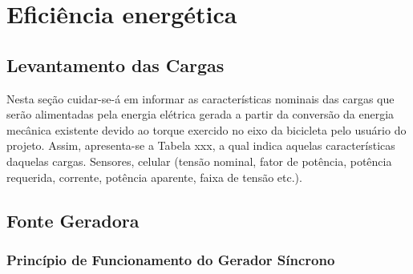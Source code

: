 \section{Eficiência energética}

\subsection{Levantamento das Cargas}
\label{levantamento-cargas}

Nesta seção cuidar-se-á em informar as características nominais das cargas que serão alimentadas pela energia elétrica gerada a partir da conversão da energia mecânica existente devido ao torque exercido no eixo da bicicleta pelo usuário do projeto. Assim, apresenta-se a Tabela xxx, a qual indica aquelas características daquelas cargas.
Sensores, celular (tensão nominal, fator de potência, potência requerida, corrente, potência aparente, faixa de tensão etc.).

\subsection{Fonte Geradora}
\label{fonte-geradora}

\subsubsection{Princípio de Funcionamento do Gerador Síncrono}
\label{gerador-sincrono}


